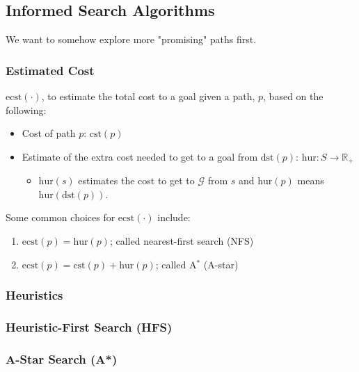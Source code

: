 \subsection{Informed Search Algorithms}
\begin{motivation}
    We want to somehow explore more "promising" paths first.    
\end{motivation}

\subsubsection{Estimated Cost}
\begin{definition}
    $\text{ecst}(\cdot)$, to estimate the total cost to a goal given a path, $p$, based on the following:
    \begin{itemize}
        \item Cost of path $p$: $\text{cst}(p)$
        \item Estimate of the extra cost needed to get to a goal from $\text{dst}(p)$: $\text{hur} : S \to \mathbb{R}_+$
        \begin{itemize}
            \item $\text{hur}(s)$ estimates the cost to get to $\mathcal{G}$ from $s$ and $\text{hur}(p)$ means $\text{hur}(\text{dst}(p))$.
        \end{itemize}
    \end{itemize}
\end{definition}

\begin{example}
    Some common choices for $\text{ecst}(\cdot)$ include:
    \begin{enumerate}
        \item $\text{ecst}(p) = \text{hur}(p)$; called nearest-first search (NFS)
        \item $\text{ecst}(p) = \text{cst}(p) + \text{hur}(p)$; called A$^*$ (A-star)
    \end{enumerate}
\end{example}
\subsubsection{Heuristics}


\subsubsection{Heuristic-First Search (HFS)}

\subsubsection{A-Star Search (A*)}

